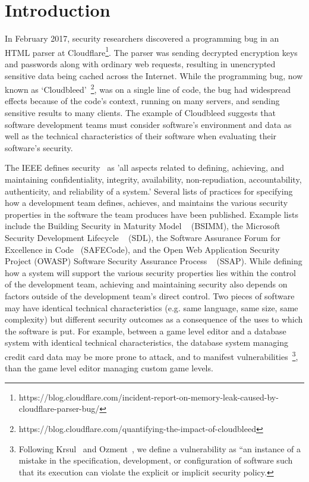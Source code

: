 \section{Introduction}
\label{sec:intro}
In February 2017, security researchers discovered a programming bug in an HTML parser at Cloudflare\footnote{https://blog.cloudflare.com/incident-report-on-memory-leak-caused-by-cloudflare-parser-bug/}. The parser was sending decrypted encryption keys and passwords along with ordinary web requests, resulting in unencrypted sensitive data being cached across the Internet. While the programming bug, now known as `Cloudbleed'~\footnote{https://blog.cloudflare.com/quantifying-the-impact-of-cloudbleed}, was on a single line of code, the bug had widespread effects because of the code's context, running on many servers, and sending sensitive results to many clients. The example of Cloudbleed suggests that software development teams must consider software's environment and data as well as the technical characteristics of their software when evaluating their software's security. 

The IEEE defines security~\cite{ieee1990glossary} as 'all aspects related to defining, achieving, and maintaining confidentiality, integrity, availability, non-repudiation, accountability, authenticity, and reliability of a system.' Several lists of practices for specifying how a development team defines, achieves, and maintains the various security properties in the software the team produces have been published. Example lists include the Building Security in Maturity Model ~\cite{mcgraw2006software}
(BSIMM), the Microsoft Security Development Lifecycle ~\cite{howard2009security} (SDL), the Software Assurance Forum for Excellence in Code~\cite{simpson2013fundamental} (SAFECode), and the Open Web Application Security Project (OWASP) Software Security Assurance Process ~\cite{martinez2014ssap} (SSAP). While defining how a system will support the various security properties lies within the control of the development team, achieving and maintaining security also depends on factors outside of the development team's direct control. Two pieces of software may have identical technical characteristics (e.g. same language, same size, same complexity) but different security outcomes as a consequence of the uses to which the software is put. For example, between a game level editor and a database system with identical technical characteristics, the database system managing credit card data may be more prone to attack, and to manifest vulnerabilities~\footnote{Following Krsul~\cite{krsul1998software} and Ozment~\cite{ozment2007vulnerability}, we define a vulnerability as “an instance of a mistake in the specification, development, or configuration of software such that its execution can violate the explicit or implicit security policy.}, than the game level editor managing custom game levels. 

